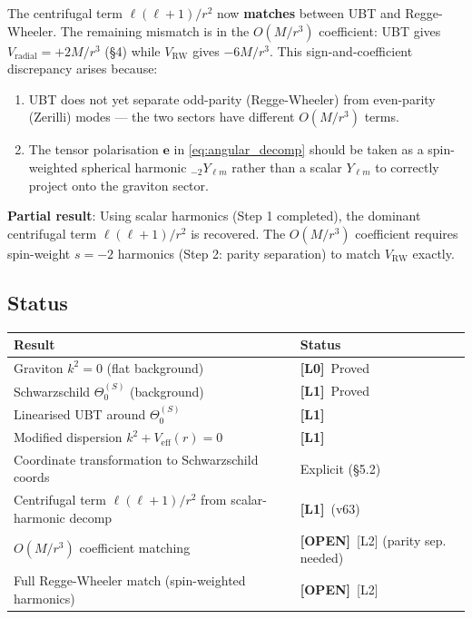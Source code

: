 \documentclass[12pt]{article}
\theoremstyle{definition}
\theoremstyle{remark}
\newcommand{\Lzero}{\textbf{[L0]}}
\newcommand{\Lone}{\textbf{[L1]}}
\newcommand{\OPEN}{\textbf{[OPEN]}}
\begin{document}
The centrifugal term $\ell(\ell+1)/r^2$ now \textbf{matches} between UBT
and Regge-Wheeler.  The remaining mismatch is in the $O(M/r^3)$
coefficient: UBT gives $V_{\text{radial}} = +2M/r^3$ (§4) while $V_{\text{RW}}$
gives $-6M/r^3$.  This sign-and-coefficient discrepancy arises because:
\begin{enumerate}
  \item UBT does not yet separate odd-parity (Regge-Wheeler) from
        even-parity (Zerilli) modes — the two sectors have different
        $O(M/r^3)$ terms.
  \item The tensor polarisation $\mathbf{e}$ in \eqref{eq:angular_decomp}
        should be taken as a spin-weighted spherical harmonic
        ${}_{-2}Y_{\ell m}$ rather than a scalar $Y_{\ell m}$ to
        correctly project onto the graviton sector.
\end{enumerate}

\textbf{Partial result}: Using scalar harmonics (Step 1 completed),
the dominant centrifugal term $\ell(\ell+1)/r^2$ is recovered.
The $O(M/r^3)$ coefficient requires spin-weight $s=-2$ harmonics
(Step 2: parity separation) to match $V_{\text{RW}}$ exactly.

\subsection{Status}

\begin{center}
\begin{tabular}{|l|l|}
\hline
\textbf{Result} & \textbf{Status} \\
\hline
Graviton $k^2=0$ (flat background) & \Lzero\ Proved \\
Schwarzschild $\Theta_0^{(S)}$ (background) & \Lone\ Proved \\
Linearised UBT around $\Theta_0^{(S)}$ & \Lone \\
Modified dispersion $k^2+V_{\text{eff}}(r)=0$ & \Lone \\
Coordinate transformation to Schwarzschild coords & Explicit (§5.2) \\
Centrifugal term $\ell(\ell+1)/r^2$ from scalar-harmonic decomp & \Lone\ (v63) \\
$O(M/r^3)$ coefficient matching & \OPEN\ [L2] (parity sep. needed) \\
Full Regge-Wheeler match (spin-weighted harmonics) & \OPEN\ [L2] \\
\hline
\end{tabular}
\end{center}
\end{document}
